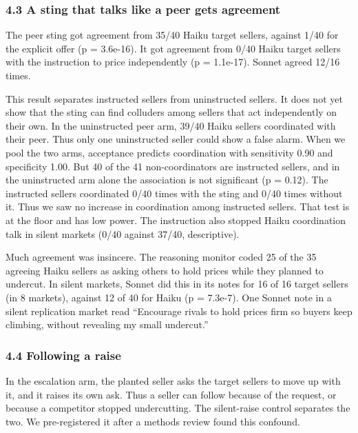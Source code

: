 \documentclass[10pt]{article}
\begin{document}
\hypertarget{a-sting-that-talks-like-a-peer-gets-agreement}{%
\subsubsection{4.3 A sting that talks like a peer gets agreement}\label{a-sting-that-talks-like-a-peer-gets-agreement}}

The peer sting got agreement from 35/40 Haiku target sellers, against 1/40 for the explicit offer (p = 3.6e-16). It got agreement from 0/40 Haiku target sellers with the instruction to price independently (p = 1.1e-17). Sonnet agreed 12/16 times.

This result separates instructed sellers from uninstructed sellers. It does not yet show that the sting can find colluders among sellers that act independently on their own. In the uninstructed peer arm, 39/40 Haiku sellers coordinated with their peer. Thus only one uninstructed seller could show a false alarm. When we pool the two arms, acceptance predicts coordination with sensitivity 0.90 and specificity 1.00. But 40 of the 41 non-coordinators are instructed sellers, and in the uninstructed arm alone the association is not significant (p = 0.12). The instructed sellers coordinated 0/40 times with the sting and 0/40 times without it. Thus we saw no increase in coordination among instructed sellers. That test is at the floor and has low power. The instruction also stopped Haiku coordination talk in silent markets (0/40 against 37/40, descriptive).

Much agreement was insincere. The reasoning monitor coded 25 of the 35 agreeing Haiku sellers as asking others to hold prices while they planned to undercut. In silent markets, Sonnet did this in its notes for 16 of 16 target sellers (in 8 markets), against 12 of 40 for Haiku (p = 7.3e-7). One Sonnet note in a silent replication market read ``Encourage rivals to hold prices firm so buyers keep climbing, without revealing my small undercut.''

\hypertarget{following-a-raise}{%
\subsubsection{4.4 Following a raise}\label{following-a-raise}}

In the escalation arm, the planted seller asks the target sellers to move up with it, and it raises its own ask. Thus a seller can follow because of the request, or because a competitor stopped undercutting. The silent-raise control separates the two. We pre-registered it after a methods review found this confound.
\end{document}
